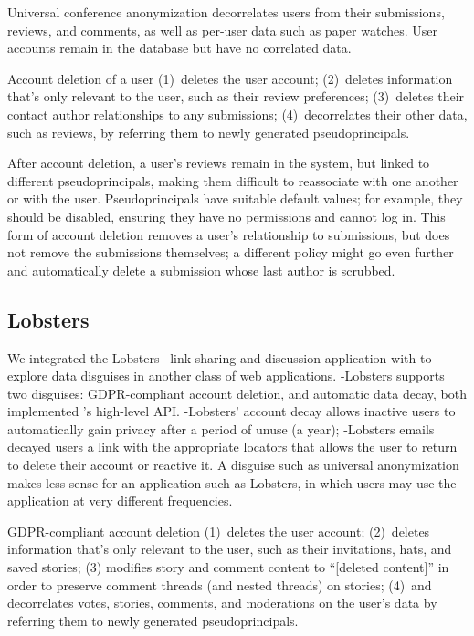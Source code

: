 Universal conference anonymization decorrelates users from their submissions, reviews, and comments,
as well as per-user data such as paper watches. User accounts remain in the database but have no
correlated data.

 Account deletion of a user 
%
(1)~deletes the user account;
%
(2)~deletes information that's only relevant to the user, such as their review preferences;
%
(3)~deletes their contact author relationships to any submissions;
%
(4)~decorrelates their other data, such as reviews, by referring them to newly generated
pseudoprincipals.

After account deletion, a user's reviews remain in the system, but linked to different
pseudoprincipals, making them difficult to reassociate with one another or with the user.
%
Pseudoprincipals have suitable default values; for example, they should be disabled, ensuring they
have no permissions and cannot log in.
%
This form of account deletion removes a user's relationship to submissions, but does not remove the
submissions themselves; a different policy might go even further and automatically delete a
submission whose last author is scrubbed.


\subsection{Lobsters} 
We integrated the Lobsters~\cite{lobsters} link-sharing and discussion application with \sys to
explore data disguises in another class of web applications. \sys-Lobsters supports two disguises:
GDPR-compliant account deletion, and automatic data decay, both implemented \sys's high-level API.
\sys-Lobsters' account decay allows inactive users to automatically gain privacy after a period of
unuse (\eg a year); \sys-Lobsters emails decayed users a link with the appropriate locators that
allows the user to return to delete their account or reactive it. A disguise such as universal
anonymization makes less sense for an application such as Lobsters, in which users may use the
application at very different frequencies.

GDPR-compliant account deletion 
%
(1)~deletes the user account;
%
(2)~deletes information that's only relevant to the user, such as their invitations, hats, and saved
stories;
%
(3) modifies story and comment content to ``[deleted content]'' in order to preserve comment threads
(and nested threads) on stories;
%
(4)~and decorrelates votes, stories, comments, and moderations on the user's data by referring them
to newly generated pseudoprincipals.
%

